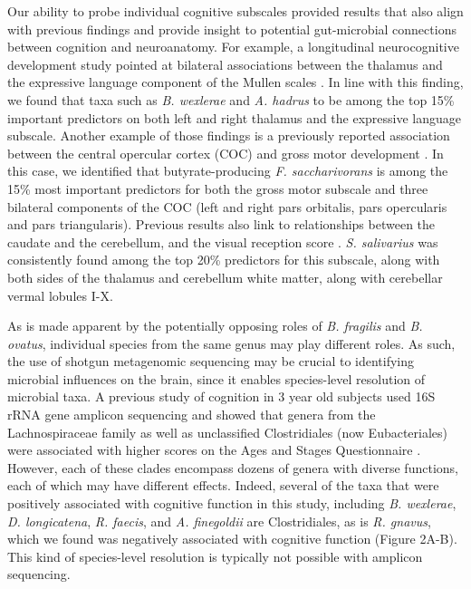 \documentclass{article}
\begin{document}
Our ability to probe individual cognitive subscales provided
results that also align with previous findings and provide insight to
potential gut-microbial connections between cognition and neuroanatomy.
For example, a longitudinal neurocognitive development study pointed at bilateral
associations between the thalamus and the expressive language
component of the Mullen scales \cite{chenLongitudinalBrainMullen2023}.
In line with this finding, we found that taxa such as 
\textit{B. wexlerae} and \textit{A. hadrus} to be among the top 15\% important predictors
on both left and right thalamus and the expressive language subscale.
Another example of those findings is a previously reported association between
the central opercular cortex (COC) and gross motor development \cite{jiangBrainNetworkCognition2023}.
In this case, we identified that
butyrate-producing \textit{F. saccharivorans} is among the 15\% most important predictors
for both the gross motor subscale and three bilateral components of the COC
(left and right pars orbitalis, pars opercularis and pars triangularis).
Previous results also link to relationships between the caudate and the cerebellum,
and the visual reception score \cite{deoniMyelinationMullenPreprint2022}.
\textit{S. salivarius} was consistently found among the top 20\% predictors for this subscale, along with
both sides of the thalamus and cerebellum white matter, along with cerebellar vermal lobules I-X.

As is made apparent by the potentially opposing roles of 
\textit{B. fragilis} and \textit{B. ovatus},
individual species from the same genus may play different roles.
As such, the use of shotgun metagenomic sequencing
may be crucial to identifying microbial influences on the brain,
since it enables species-level resolution of microbial taxa.
A previous study of
cognition in 3 year old subjects used 16S rRNA gene amplicon sequencing
and showed that genera from the Lachnospiraceae family as well as
unclassified Clostridiales (now Eubacteriales) were associated with
higher scores on the Ages and Stages Questionnaire
\cite{sordilloAssociationInfantGut2019}.
However, each of these clades encompass dozens of genera with
diverse functions, each of which may have different effects. Indeed,
several of the taxa that were positively associated with cognitive
function in this study, including \emph{B. wexlerae}, \emph{D.
longicatena}, \emph{R. faecis}, and \emph{A. finegoldii} are
Clostridiales, as is \emph{R. gnavus}, which we found was negatively
associated with cognitive function (Figure 2A-B). This kind of
species-level resolution is typically not possible with amplicon
sequencing.
\end{document}
